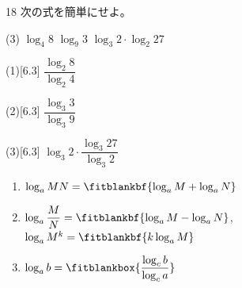 \documentclass[14pt,dvipdfmx]{jsarticle}
\begin{document}
\begin{practiceprob}{18}
  次の式を簡単にせよ。
  \par\vspace{-0.35em}
  \begin{tasks}[label=(\arabic*), label-width=1.6zw, item-indent=2zw, after-item-skip=0.04em](3)
    \task $\log_{4} 8$
    \task $\log_{9} 3$
    \task $\log_{3} 2 \cdot \log_{2} 27$
  \end{tasks}
\end{practiceprob}

\noindent
\begin{minipage}[t]{0.32\linewidth}
\begin{answerbox}{(1)}[6.3]
  $\dfrac{\log_{2} 8}{\log_{2} 4}$\par\vspace{0.45em}
\end{answerbox}
\end{minipage}\hfill
\begin{minipage}[t]{0.32\linewidth}
\begin{answerbox}{(2)}[6.3]
  $\dfrac{\log_{3} 3}{\log_{3} 9}$\par\vspace{0.45em}
\end{answerbox}
\end{minipage}\hfill
\begin{minipage}[t]{0.32\linewidth}
\begin{answerbox}{(3)}[6.3]
  $\log_{3} 2 \cdot \dfrac{\log_{3} 27}{\log_{3} 2}$
  \par\vspace{1.5em}
\end{answerbox}
\end{minipage}

\begin{summarybox}
  \begin{enumerate}[label=\textbf{\arabic*}, leftmargin=1.5zw, itemsep=0.02em]
    \item $\log_{a} MN = \fitblankbf{\log_{a} M + \log_{a} N}$
    \item $\log_{a} \dfrac{M}{N} = \fitblankbf{\log_{a} M - \log_{a} N}$,\quad
          $\log_{a} M^{k} = \fitblankbf{k \log_{a} M}$
          \par\vspace{0.5em}
    \item $\log_{a} b = \fitblankbox{\dfrac{\log_{c} b}{\log_{c} a}}$
  \end{enumerate}
\end{summarybox}

\vfill
{}
\end{document}
